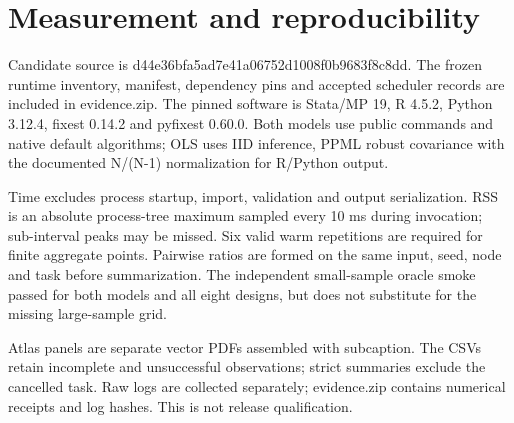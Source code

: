 \documentclass[11pt]{article}
\begin{document}
\section{Measurement and reproducibility}

Candidate source is d44e36bfa5ad7e41a06752d1008f0b9683f8c8dd. The frozen runtime inventory, manifest, dependency pins and accepted scheduler records are included in evidence.zip. The pinned software is Stata/MP 19, R 4.5.2, Python 3.12.4, fixest 0.14.2 and pyfixest 0.60.0. Both models use public commands and native default algorithms; OLS uses IID inference, PPML robust covariance with the documented N/(N-1) normalization for R/Python output.

Time excludes process startup, import, validation and output serialization. RSS is an absolute process-tree maximum sampled every 10 ms during invocation; sub-interval peaks may be missed. Six valid warm repetitions are required for finite aggregate points. Pairwise ratios are formed on the same input, seed, node and task before summarization. The independent small-sample oracle smoke passed for both models and all eight designs, but does not substitute for the missing large-sample grid.

Atlas panels are separate vector PDFs assembled with subcaption. The CSVs retain incomplete and unsuccessful observations; strict summaries exclude the cancelled task. Raw logs are collected separately; evidence.zip contains numerical receipts and log hashes. This is not release qualification.
\end{document}
